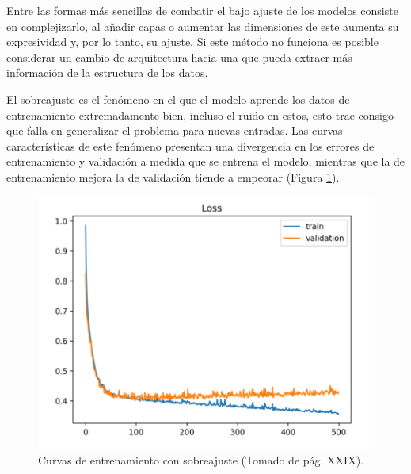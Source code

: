 Entre las formas más sencillas de combatir el bajo ajuste de los modelos consiste en complejizarlo, al añadir
capas o aumentar las dimensiones de este aumenta su expresividad y, por lo tanto, su ajuste. Si este método 
no funciona es posible considerar un cambio de arquitectura hacia una que pueda extraer más información de la 
estructura de los datos. 

El sobreajuste es el fenómeno en el que el modelo aprende los datos de entrenamiento extremadamente bien, incluso
el ruido en estos, esto trae consigo que falla en generalizar el problema para nuevas entradas. Las curvas 
características de este fenómeno presentan una divergencia en los errores de entrenamiento y validación a medida
que se entrena el modelo, mientras que la de entrenamiento mejora la de validación tiende a empeorar (Figura \ref{fig:overfit}). 

\begin{figure}[h!]
	\begin{center}
		\begin{center}
			\includegraphics[scale=.3]{Graphics/overfit_raising_val_error.png}
        \end{center}
	    \caption{Curvas de entrenamiento con sobreajuste (Tomado de \textcite{brownlee2018better} pág. XXIX).}\label{fig:overfit}
	\end{center}
\end{figure}


